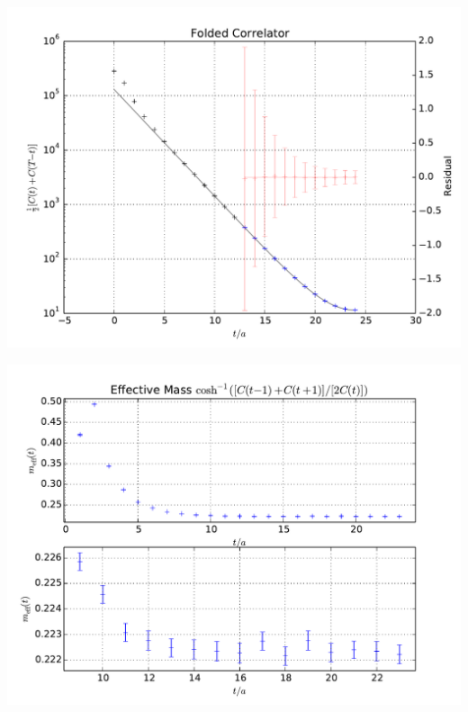 \documentclass[english, fleqn]{beamer}
\begin{document}
\begin{frame}
    \begin{centering}
        \includegraphics[height=\textheight]{plots/A100_24_L24_T48_beta190_mul0100_musig150_mudel190_kappa1632550__ev120__TB2_SO_LI6_new_c4_folded.pdf}
    \end{centering}
\end{frame}

\begin{frame}
    \begin{centering}
        \includegraphics[height=\textheight]{plots/A100_24_L24_T48_beta190_mul0100_musig150_mudel190_kappa1632550__ev120__TB2_SO_LI6_new_c2_m_eff.pdf}
    \end{centering}
\end{frame}
\end{document}
